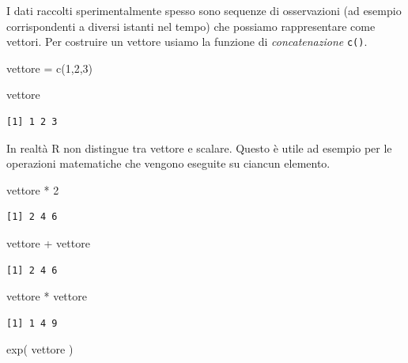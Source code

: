 \documentclass[
  italian,
  letterpaper,
]{book}
\newenvironment{Shaded}{\begin{snugshade}}{\end{snugshade}}
\newcommand{\DecValTok}[1]{\textcolor[rgb]{0.68,0.00,0.00}{#1}}
\newcommand{\FunctionTok}[1]{\textcolor[rgb]{0.28,0.35,0.67}{#1}}
\newcommand{\NormalTok}[1]{\textcolor[rgb]{0.00,0.23,0.31}{#1}}
\newcommand{\OtherTok}[1]{\textcolor[rgb]{0.00,0.23,0.31}{#1}}
\newcommand{\SpecialCharTok}[1]{\textcolor[rgb]{0.37,0.37,0.37}{#1}}
\theoremstyle{definition}
\theoremstyle{remark}
\begin{document}
I dati raccolti sperimentalmente spesso sono sequenze di osservazioni
(ad esempio corrispondenti a diversi istanti nel tempo) che possiamo
rappresentare come vettori. Per costruire un vettore usiamo la funzione
di \emph{concatenazione} \texttt{c()}.

\begin{Shaded}
\begin{Highlighting}[]
\NormalTok{vettore }\OtherTok{=} \FunctionTok{c}\NormalTok{(}\DecValTok{1}\NormalTok{,}\DecValTok{2}\NormalTok{,}\DecValTok{3}\NormalTok{)}

\NormalTok{vettore}
\end{Highlighting}
\end{Shaded}

\begin{verbatim}
[1] 1 2 3
\end{verbatim}

In realtà R non distingue tra vettore e scalare. Questo è utile ad
esempio per le operazioni matematiche che vengono eseguite su ciancun
elemento.

\begin{Shaded}
\begin{Highlighting}[]
\NormalTok{vettore }\SpecialCharTok{*} \DecValTok{2}
\end{Highlighting}
\end{Shaded}

\begin{verbatim}
[1] 2 4 6
\end{verbatim}

\begin{Shaded}
\begin{Highlighting}[]
\NormalTok{vettore }\SpecialCharTok{+}\NormalTok{ vettore}
\end{Highlighting}
\end{Shaded}

\begin{verbatim}
[1] 2 4 6
\end{verbatim}

\begin{Shaded}
\begin{Highlighting}[]
\NormalTok{vettore }\SpecialCharTok{*}\NormalTok{ vettore}
\end{Highlighting}
\end{Shaded}

\begin{verbatim}
[1] 1 4 9
\end{verbatim}

\begin{Shaded}
\begin{Highlighting}[]
\FunctionTok{exp}\NormalTok{( vettore )}
\end{Highlighting}
\end{Shaded}
\end{document}

